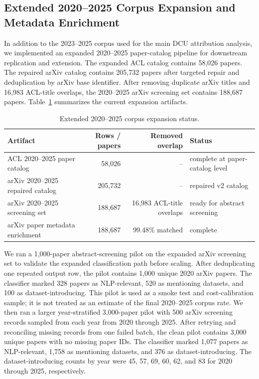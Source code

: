 \documentclass[11pt]{article}
\begin{document}
\subsection{Extended 2020--2025 Corpus Expansion and Metadata Enrichment}
\label{app:extended_corpus}

In addition to the 2023--2025 corpus used for the main DCU attribution analysis, we implemented an expanded 2020--2025 paper-catalog pipeline for downstream replication and extension.
The expanded ACL catalog contains 58,026 papers.
The repaired arXiv catalog contains 205,732 papers after targeted repair and deduplication by arXiv base identifier.
After removing duplicate arXiv titles and 16,983 ACL-title overlaps, the 2020--2025 arXiv screening set contains 188,687 papers.
Table~\ref{tab:extended_corpus_status} summarizes the current expansion artifacts.

\begin{table}[h]
\centering
\small
\begin{tabular}{lrrl}
\toprule
Artifact & Rows / papers & Removed overlap & Status \\
\midrule
ACL 2020--2025 paper catalog & 58,026 & -- & complete at paper-catalog level \\
arXiv 2020--2025 repaired catalog & 205,732 & -- & repaired v2 catalog \\
arXiv 2020--2025 screening set & 188,687 & 16,983 ACL-title overlaps & ready for abstract screening \\
arXiv paper metadata enrichment & 188,687 & 99.48\% matched & complete \\
\bottomrule
\end{tabular}
\caption{Extended 2020--2025 corpus expansion status.}
\label{tab:extended_corpus_status}
\end{table}

We ran a 1,000-paper abstract-screening pilot on the expanded arXiv screening set to validate the expanded classification path before scaling.
After deduplicating one repeated output row, the pilot contains 1,000 unique 2020 arXiv papers.
The classifier marked 328 papers as NLP-relevant, 520 as mentioning datasets, and 100 as dataset-introducing.
This pilot is used as a smoke test and cost-calibration sample; it is not treated as an estimate of the final 2020--2025 corpus rate.
We then ran a larger year-stratified 3,000-paper pilot with 500 arXiv screening records sampled from each year from 2020 through 2025.
After retrying and reconciling missing records from one failed batch, the clean pilot contains 3,000 unique papers with no missing paper IDs.
The classifier marked 1,077 papers as NLP-relevant, 1,758 as mentioning datasets, and 376 as dataset-introducing.
The dataset-introducing counts by year were 45, 57, 69, 60, 62, and 83 for 2020 through 2025, respectively.
\end{document}
